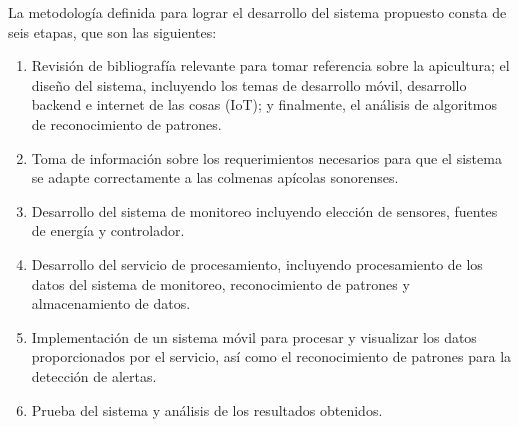 
La metodología definida para lograr el desarrollo del sistema propuesto consta de seis etapas, que son las siguientes:
\begin{enumerate}
    \item Revisión de bibliografía relevante para tomar referencia sobre la apicultura; el diseño del sistema, incluyendo los temas de desarrollo móvil, desarrollo backend e internet de las cosas (IoT); y finalmente, el análisis de algoritmos de reconocimiento de patrones.
    \item Toma de información sobre los requerimientos necesarios para que el sistema se adapte correctamente a las colmenas apícolas sonorenses.
    \item Desarrollo del sistema de monitoreo incluyendo elección de sensores, fuentes de energía y controlador.
    \item Desarrollo del servicio de procesamiento, incluyendo procesamiento de los datos del sistema de monitoreo, reconocimiento de patrones y almacenamiento de datos.
    \item Implementación de un sistema móvil para procesar y visualizar los datos proporcionados por el servicio, así como el reconocimiento de patrones para la detección de alertas.
    \item Prueba del sistema y análisis de los resultados obtenidos.
\end{enumerate}
